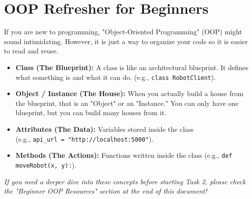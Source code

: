 \documentclass[a4paper,12pt]{article}
\begin{document}
\begin{center}
{
}
\end{center}
\vspace{0.4cm}


\section*{OOP Refresher for Beginners}
If you are new to programming, "Object-Oriented Programming" (OOP) might sound intimidating. However, it is just a way to organize your code so it is easier to read and reuse.
\begin{itemize}
    \item \textbf{Class (The Blueprint):} A class is like an architectural blueprint. It defines what something is and what it can do. (e.g., \texttt{class RobotClient}).
    \item \textbf{Object / Instance (The House):} When you actually build a house from the blueprint, that is an "Object" or an "Instance." You can only have one blueprint, but you can build many houses from it.
    \item \textbf{Attributes (The Data):} Variables stored inside the class\\ (e.g., \texttt{api\_url = "http://localhost:5000"}).
    \item \textbf{Methods (The Actions):} Functions written inside the class (e.g., \texttt{def moveRobot(x, y):}).
\end{itemize}
\textit{If you need a deeper dive into these concepts before starting Task 2, please check the "Beginner OOP Resources" section at the end of this document!}
\end{document}
